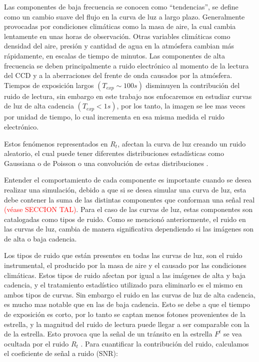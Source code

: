 Las componentes de baja frecuencia se conocen como ``tendencias'', se define como un cambio suave del flujo en la curva de luz a largo plazo. Generalmente provocadas por condiciones climáticas como la masa de aire, la cual cambia lentamente en unas horas de observación. Otras variables climáticas como densidad del aire, presión y cantidad de agua en la atmósfera cambian más rápidamente, en escalas de tiempo de minutos. Las componentes de alta frecuencia se deben principalmente a ruido electrónico al momento de la lectura del CCD y a la aberraciones del frente de onda causados por la atm\'osfera. Tiempos de exposición largos $(T_{exp} \sim 100 s)$ disminuyen la contribución del ruido de lectura, sin embargo en este trabajo nos enfocaremos en estudiar curvas de luz de alta cadencia $(T_{exp} < 1 s)$, por los tanto, la imagen se lee mas veces por unidad de tiempo, lo cual incrementa en esa misma medida el ruido electr\'onico.

Estos fenómenos representados en $R_{t}$, afectan la curva de luz creando un ruido aleatorio, el cual puede tener diferentes distribuciones estadísticas como Gaussiana o de Poisson o una convolución de estas distribuciones \cite{luisier2010image}.

Entender el comportamiento de cada componente es importante cuando se desea realizar una simulación, debido a que si se desea simular una curva de luz, esta debe contener la suma de las distintas componentes que conforman una señal real \textcolor{red}{(véase SECCION TAL)}. Para el caso de las curvas de luz, estas componentes son catalogadas como tipos de ruido. Como se mencionó anteriormente, el ruido en las curvas de luz, cambia de manera significativa dependiendo si las imágenes son de alta o baja cadencia.

Los tipos de ruido que están presentes en todas las curvas de luz, son el ruido instrumental, el producido por la masa de aire y el causado por las condiciones climáticas. Estos tipos de ruido afectan por igual a las imágenes de alta y baja cadencia, y el tratamiento estadístico utilizado para eliminarlo es el mismo en ambos tipos de curvas. Sin embargo el ruido en las curvas de luz de alta cadencia, es mucho mas notable que en las de baja cadencia. Esto se debe a que el tiempo de exposición es corto, por lo tanto se captan menos fotones provenientes de la estrella, y la magnitud del ruido de lectura puede llegar a ser comparable con la de la estrella. Esto provoca que la señal de un tránsito en la estrella $F^{t}$  se vea ocultada por el ruido $R_{t}$ \cite{pont2006effect}. Para cuantificar la contribución del ruido, calculamos el coeficiente de señal a ruido (SNR):

